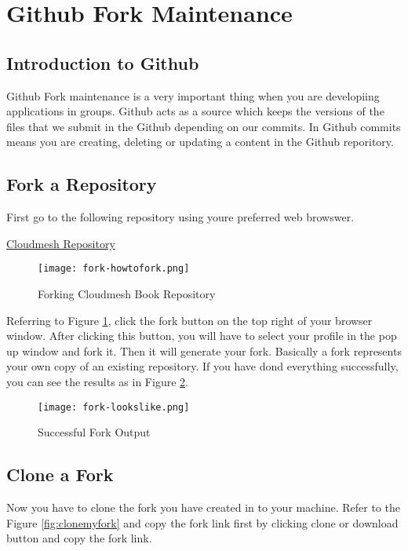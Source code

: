 \section{Github Fork Maintenance}\label{s:github-fork-maintenance}

\subsection{Introduction to Github}
Github Fork maintenance is a very important thing when you are
developiing applications in groups. Github acts as a source which
keeps the versions of the files that we submit in the Github depending
on our commits. In Github commits means you are creating, deleting or
updating a content in the Github reporitory.

\subsection{Fork a Repository}

First go to the following repository using youre preferred web
browswer.

\href{https://www.github.com/cloudmesh/book}{Cloudmesh Repository}

\begin{figure}[htb]\label{fig:howtofork}
\centering
\texttt{[image: fork-howtofork.png]}
\caption{Forking Cloudmesh Book Repository
}
\end{figure}

Referring to Figure \ref{fig:howtofork}, click the fork button on the
top right of your browser window. After clicking this button, you will
have to select your profile in the pop up window and fork it. Then it
will generate your fork. Basically a fork represents your own copy of
an existing repository. If you have dond everything successfully, you
can see the results as in Figure \ref{fig:myfork}.

\begin{figure}[htb]\label{fig:myfork}
\centering
\texttt{[image: fork-lookslike.png]}
\caption{Successful Fork Output
}
\end{figure}

\subsection{Clone a Fork}

Now you have to clone the fork you have created in to your machine.
Refer to the Figure \ref{fig:clonemyfork} and copy the fork link
first by clicking clone or download button and copy the fork link.


